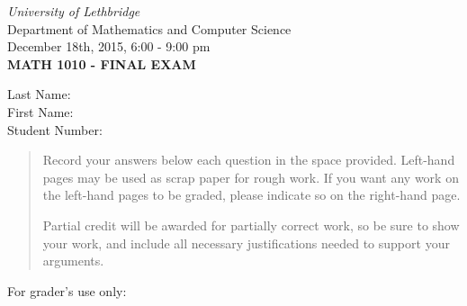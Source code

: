 \documentclass[12pt]{article}
\newcommand{\skipline}{\vspace{12pt}}
\begin{document}
\author{Instructor: Sean Fitzpatrick}
\thispagestyle{plain}
\begin{center}
\emph{University of Lethbridge}\\
Department of Mathematics and Computer Science\\
December 18th, 2015, 6:00 - 9:00 pm\\
{\bf MATH 1010 - FINAL EXAM}\\
\end{center}
\skipline \skipline \skipline \noindent \skipline
Last Name:\underline{\hspace{350pt}}\\
\skipline
First Name:\underline{\hspace{348pt}}\\
\skipline
Student Number:\underline{\hspace{322pt}}\\
\skipline

\vspace{0.5in}


\begin{quote}

 
 Record your answers below each question in the space provided.    Left-hand pages may be used as scrap paper for rough work.  If you want any work on the left-hand pages to be graded, please indicate so on the right-hand page.
 
 \bigskip
 
Partial credit will be awarded for partially correct work, so be sure to show your work, and include all necessary justifications needed to support your arguments. 

\bigskip

\end{quote}


\vspace{0.25in}

For grader's use only:
\end{document}
